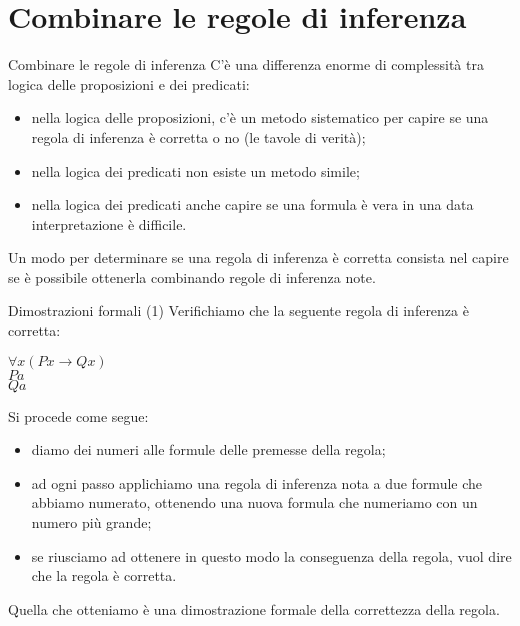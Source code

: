 \documentclass[10pt,dvipsnames,xcolor=table,handout]{beamer}
\begin{document}
\section{Combinare le regole di inferenza}

\begin{frame}{Combinare le regole di inferenza}
    C'è una differenza enorme di complessità tra logica delle proposizioni e dei predicati:
    \begin{itemize}
        \item nella logica delle proposizioni, c'è un metodo sistematico per capire se una regola di inferenza è corretta o no (le tavole di verità);
        \item nella logica dei predicati non esiste un metodo simile;
        \item nella logica dei predicati anche capire se una formula è vera in una data interpretazione è difficile.
    \end{itemize}

    \medskip
    Un modo per determinare se una regola di inferenza è corretta consista nel capire se è possibile ottenerla \alert{combinando regole di inferenza note}.
\end{frame}

\begin{frame}{Dimostrazioni formali (1)}
    Verifichiamo che la seguente regola di inferenza è corretta:
    \begin{center}
        \begin{inference}
            $\forall x (Px \to Qx)$\\
            $Pa$\\
            \hline
            $Qa$
        \end{inference}
    \end{center}
    Si procede come segue:
    \begin{itemize}
        \item diamo dei numeri alle formule delle premesse della regola;
        \item ad ogni passo applichiamo una regola di inferenza nota a due formule che abbiamo numerato, ottenendo una nuova formula che numeriamo con un numero più grande;
        \item se riusciamo ad ottenere in questo modo la conseguenza della regola, vuol dire che la regola è corretta.
    \end{itemize}
    Quella che otteniamo è una \alert{dimostrazione formale} della correttezza della regola.
\end{frame}
\end{document}
